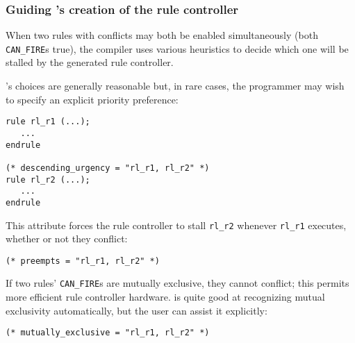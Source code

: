\begin{frame}[fragile]
\frametitle{Guiding {\bsc}'s creation of the rule controller}

\footnotesize

When two rules with conflicts may both be enabled simultaneously (both
{\tt CAN\_FIRE}s true), the {\bsc} compiler uses various heuristics to
decide which one will be stalled by the generated rule controller.

\vspace{2ex}

\begin{minipage}{0.5\textwidth}
 {\bsc}'s choices are generally reasonable but, in rare cases, the
 programmer may wish to specify an explicit priority preference:
\end{minipage}
\hm
\begin{minipage}{0.45\textwidth}
\begin{Verbatim}[frame=single]
rule rl_r1 (...);
   ...
endrule

(* descending_urgency = "rl_r1, rl_r2" *)
rule rl_r2 (...);
   ...
endrule
\end{Verbatim}
\end{minipage}

\vspace{4ex}

\begin{minipage}{0.5\textwidth}
This attribute forces the rule controller to stall \verb|rl_r2|
whenever \verb|rl_r1| executes, whether or not they conflict:
\end{minipage}
\hm
\begin{minipage}{0.45\textwidth}
\begin{Verbatim}[frame=single]
(* preempts = "rl_r1, rl_r2" *)
\end{Verbatim}
\end{minipage}

\vspace{4ex}

\begin{minipage}{0.5\textwidth}
If two rules' {\tt CAN\_FIRE}s are mutually exclusive, they cannot
conflict; this permits more efficient rule controller hardware.
{\bsc} is quite good at recognizing mutual exclusivity automatically,
but the user can assist it explicitly:
\end{minipage}
\hm
\begin{minipage}{0.45\textwidth}
\begin{Verbatim}[frame=single]
(* mutually_exclusive = "rl_r1, rl_r2" *)
\end{Verbatim}
\end{minipage}

\end{frame}

